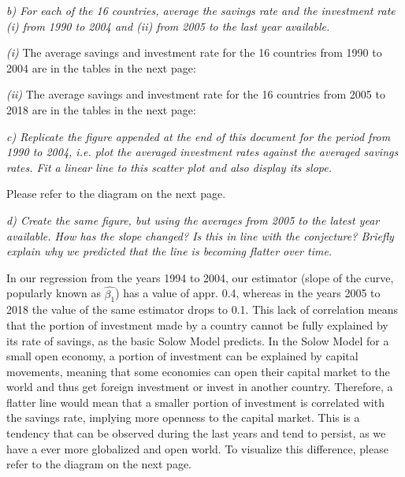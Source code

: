\documentclass[11pt]{article} %
\begin{document}
\pagebreak

\pagebreak

\noindent\textit{b) For each of the 16 countries, average the savings rate and the investment rate (i) from 1990 to 2004 and (ii) from 2005 to the last year available.}\par

\noindent\textit{(i)} The average savings and investment rate for the 16 countries from 1990 to 2004 are in the tables in the next page:\par


\pagebreak

\noindent\textit{(ii)} The average savings and investment rate for the 16 countries from 2005 to 2018 are in the tables in the next page:\par


\pagebreak

\noindent\textit{c) Replicate the figure appended at the end of this document for the period from 1990 to
2004, i.e. plot the averaged investment rates against the averaged savings rates. Fit a
linear line to this scatter plot and also display its slope.}\par

Please refer to the diagram on the next page.\par



\noindent\textit{d) Create the same figure, but using the averages from 2005 to the latest year available.
How has the slope changed? Is this in line with the conjecture? Briefly explain why
we predicted that the line is becoming flatter over time.}\par

In our regression from the years 1994 to 2004, our estimator (slope of the curve, popularly known as $\hat{\beta_1}$) has a value of appr. 0.4, whereas in the years 2005 to 2018 the value of the same estimator drops to 0.1. This lack of correlation means that the portion of investment made by a country cannot be fully explained by its rate of savings, as the basic Solow Model predicts. In the Solow Model for a small open economy, a portion of investment can be explained by capital movements, meaning that some economies can open their capital market to the world and thus get foreign investment or invest in another country. Therefore, a flatter line would mean that a smaller portion of investment is correlated with the savings rate, implying more openness to the capital market. This is a tendency that can be observed during the last years and tend to persist, as we have a ever more globalized and open world. To visualize this difference, please refer to the diagram on the next page. \par
\end{document}
